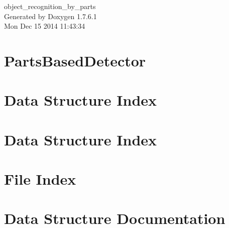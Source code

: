 \documentclass[a4paper]{book}
\begin{document}
\hypersetup{pageanchor=false,citecolor=blue}
\begin{titlepage}
\vspace*{7cm}
\begin{center}
{\Large object\-\_\-recognition\-\_\-by\-\_\-parts }\\
\vspace*{1cm}
{\large \-Generated by Doxygen 1.7.6.1}\\
\vspace*{0.5cm}
{\small Mon Dec 15 2014 11:43:34}\\
\end{center}
\end{titlepage}
\clearemptydoublepage
{}
\tableofcontents
\clearemptydoublepage
{}
\hypersetup{pageanchor=true,citecolor=blue}
\chapter{\-Parts\-Based\-Detector}
\label{index}\hypertarget{index}{}
\chapter{\-Data \-Structure \-Index}

\chapter{\-Data \-Structure \-Index}

\chapter{\-File \-Index}

\chapter{\-Data \-Structure \-Documentation}

























\end{document}
